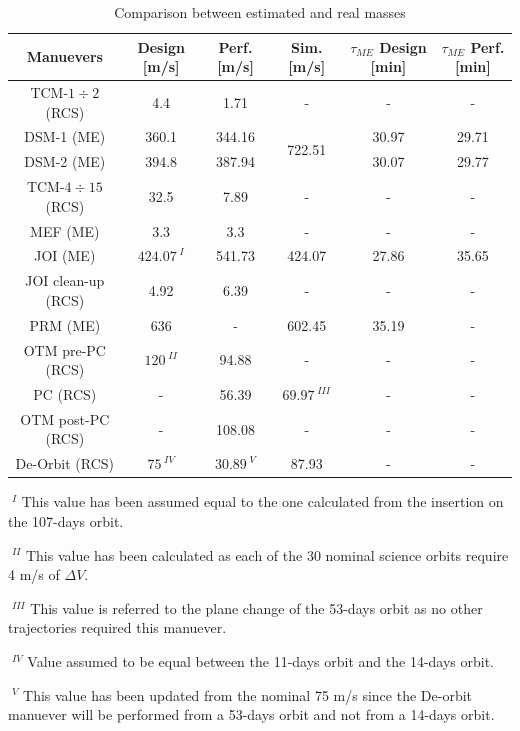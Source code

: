 \cite{fact_sheet}
\begin{table}[H]
    \renewcommand{\arraystretch}{1.3}
    \centering
    \begin{tabular}{|c|c|c|c|c|c|}
        \hline
        \textbf{Manuevers} & \textbf{Design} [m/s] & \textbf{Perf.} [m/s] & \textbf{Sim.} [m/s] & \textbf{$\tau_{ME}$ Design} [min] & \textbf{$\tau_{ME}$ Perf.} [min]  \\
        \hline
        TCM\cite{junno_inner}-$1\div2$ (RCS) & 4.4 & 1.71 & - & - & - \\
        \hline 
        \multicolumn{1}{|c|}{DSM\cite{junno_inner}-1 (ME)} & \multicolumn{1}{c|}{360.1} & \multicolumn{1}{c|}{344.16} & \multirow{2}{*}{722.51} & \multicolumn{1}{c|}{30.97} & \multicolumn{1}{c|}{29.71} \\
        \cline{1-3}
        \cline{5-6}
        \multicolumn{1}{|c|}{DSM\cite{junno_inner}-2 (ME)} & \multicolumn{1}{c|}{394.8} & \multicolumn{1}{c|}{387.94} & & \multicolumn{1}{c|}{30.07} & \multicolumn{1}{c|}{29.77} \\
        \hline
        TCM\cite{junno_inner}-$4\div15$ (RCS) & 32.5 & 7.89 & - & - & - \\
        \hline
        MEF\cite{junno_inner} (ME) & 3.3 & 3.3 & - & - & - \\
        \hline
        JOI\cite{otm} (ME) & $424.07^{\;I}$ & 541.73 & 424.07 & 27.86 & 35.65 \\
        \hline 
        JOI\cite{otm} clean-up (RCS) & 4.92 & 6.39 & - & - & - \\
        \hline
        PRM\cite{otm} (ME) & 636 & - & 602.45 & 35.19 & - \\
        \hline
        OTM\cite{nasa_otm} pre-PC (RCS) & $120^{\;II}$ & 94.88 & - & - & - \\
        \hline 
        PC (RCS) & - & 56.39 & $69.97^{\;III}$ & - & - \\
        \hline
        OTM post-PC (RCS) & - & 108.08 & - & - & - \\
        \hline
        De-Orbit\cite{spaceflight101} (RCS) & $75^{\;IV}$ & $30.89^{\;V} $& 87.93 & - & -\\
        \hline
    \end{tabular}
    \caption{Comparison between estimated and real masses}
    \label{table:masses}
\end{table}

$\;^{I}$ This value has been assumed equal to the one calculated from the insertion on the 107-days orbit. 

$\;^{II}$ This value has been calculated as each of the 30 nominal science orbits require 4 m/s of $\Delta V$.

$\;^{III}$ This value is referred to the plane change of the 53-days orbit as no other trajectories required this manuever. 

$\;^{IV}$ Value assumed to be equal between the 11-days orbit and the 14-days orbit. 

$\;^{V}$ This value has been updated from the nominal 75 m/s since the De-orbit manuever will be performed from a 53-days orbit and not from a 14-days orbit. 

